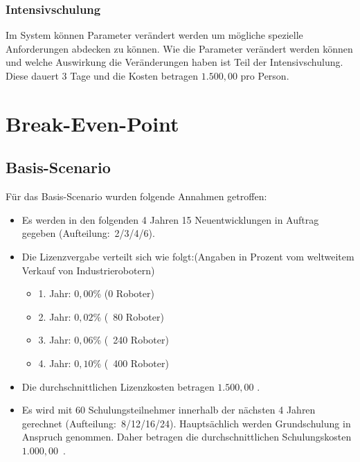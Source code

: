 \subsubsection{Intensivschulung}
Im System können Parameter verändert werden um mögliche spezielle Anforderungen abdecken zu können. Wie die Parameter verändert werden können und welche Auswirkung die Veränderungen haben ist Teil der Intensivschulung. Diese dauert 3 Tage und die Kosten betragen $1.500,00$ \officialeuro pro Person.

\section{Break-Even-Point}
\subsection{Basis-Scenario}
Für das Basis-Scenario wurden folgende Annahmen getroffen:
\begin{itemize}
	\item Es werden in den folgenden 4 Jahren 15 Neuentwicklungen in Auftrag gegeben (Aufteilung:~2/3/4/6).
	\item Die Lizenzvergabe verteilt sich wie folgt:\newline (Angaben in Prozent vom weltweitem Verkauf von Industrierobotern)
	\begin{itemize}
		\item 1. Jahr: $0,00$\% (0 Roboter)
		\item 2. Jahr: $0,02$\% (~80 Roboter)
		\item 3. Jahr: $0,06$\% (~240 Roboter)
		\item 4. Jahr: $0,10$\% (~400 Roboter)
	\end{itemize}
	\item Die durchschnittlichen Lizenzkosten betragen $1.500,00$ \officialeuro.
	\item Es wird mit 60 Schulungsteilnehmer innerhalb der nächsten 4 Jahren gerechnet (Aufteilung:~8/12/16/24). Hauptsächlich werden Grundschulung in Anspruch genommen. Daher betragen die durchschnittlichen Schulungskosten $1.000,00$~\officialeuro.
\end{itemize}


